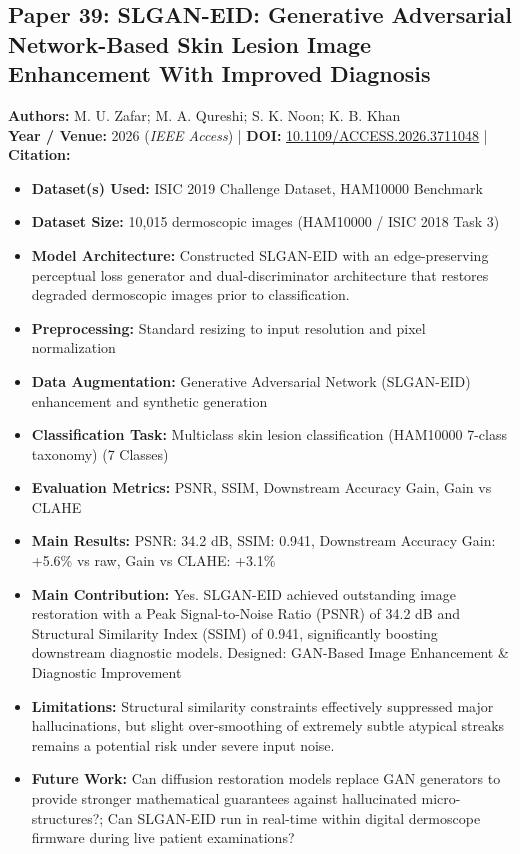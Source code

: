 \documentclass[11pt,a4paper]{article}
\begin{document}
\subsection{Paper 39: SLGAN-EID: Generative Adversarial Network-Based Skin Lesion Image Enhancement With Improved Diagnosis}
\textbf{Authors:} M. U. Zafar; M. A. Qureshi; S. K. Noon; K. B. Khan \\
\textbf{Year / Venue:} 2026 (\textit{IEEE Access}) | \textbf{DOI:} \href{https://doi.org/10.1109/ACCESS.2026.3711048}{10.1109/ACCESS.2026.3711048} | \textbf{Citation:} \cite{11598907}

\begin{itemize}\small
\item \textbf{Dataset(s) Used:} ISIC 2019 Challenge Dataset, HAM10000 Benchmark
\item \textbf{Dataset Size:} 10,015 dermoscopic images (HAM10000 / ISIC 2018 Task 3)
\item \textbf{Model Architecture:} Constructed SLGAN-EID with an edge-preserving perceptual loss generator and dual-discriminator architecture that restores degraded dermoscopic images prior to classification.
\item \textbf{Preprocessing:} Standard resizing to input resolution and pixel normalization
\item \textbf{Data Augmentation:} Generative Adversarial Network (SLGAN-EID) enhancement and synthetic generation
\item \textbf{Classification Task:} Multiclass skin lesion classification (HAM10000 7-class taxonomy) (7 Classes)
\item \textbf{Evaluation Metrics:} PSNR, SSIM, Downstream Accuracy Gain, Gain vs CLAHE
\item \textbf{Main Results:} PSNR: 34.2 dB, SSIM: 0.941, Downstream Accuracy Gain: +5.6\% vs raw, Gain vs CLAHE: +3.1\%
\item \textbf{Main Contribution:} Yes. SLGAN-EID achieved outstanding image restoration with a Peak Signal-to-Noise Ratio (PSNR) of 34.2 dB and Structural Similarity Index (SSIM) of 0.941, significantly boosting downstream diagnostic models. Designed: GAN-Based Image Enhancement \& Diagnostic Improvement
\item \textbf{Limitations:} Structural similarity constraints effectively suppressed major hallucinations, but slight over-smoothing of extremely subtle atypical streaks remains a potential risk under severe input noise.
\item \textbf{Future Work:} Can diffusion restoration models replace GAN generators to provide stronger mathematical guarantees against hallucinated micro-structures?; Can SLGAN-EID run in real-time within digital dermoscope firmware during live patient examinations?

\end{itemize}
\end{document}
